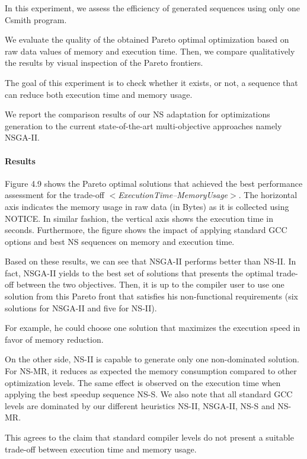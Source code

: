 In this experiment, we assess the efficiency of generated sequences using only one Csmith program.

We evaluate the quality of the obtained Pareto optimal optimization based on raw data values of memory and execution time. Then, we compare qualitatively the results by visual inspection of the Pareto frontiers.

The goal of this experiment is to check whether it exists, or not, a sequence that can reduce both execution time and memory usage.

We report the comparison results of our NS adaptation for optimizations generation to the current state-of-the-art multi-objective approaches namely NSGA-II. 

\paragraph{Results}

Figure 4.9 shows the Pareto optimal solutions that achieved the best performance assessment for the trade-off \textit{$<$ExecutionTime--MemoryUsage$>$}. 
The horizontal axis indicates the memory usage in raw data (in Bytes) as it is collected using NOTICE. In similar fashion, the vertical axis shows the execution time in seconds. Furthermore, the figure shows the impact of applying standard GCC options and best NS sequences on memory and execution time. 

Based on these results, we can see that NSGA-II performs better than NS-II. In fact, NSGA-II yields to the best set of solutions that presents the optimal trade-off between the two objectives. Then, it is up to the compiler user to use one solution from this Pareto front that satisfies his non-functional requirements (six solutions for NSGA-II and five for NS-II). 

For example, he could choose one solution that maximizes the execution speed in favor of memory reduction. 

On the other side, NS-II is capable to generate only one non-dominated solution. For NS-MR, it reduces as expected the memory consumption compared to other optimization levels. The same effect is observed on the execution time when applying the best speedup sequence NS-S. We also note that all standard GCC levels are dominated by our different heuristics NS-II, NSGA-II, NS-S and NS-MR.

This agrees to the claim that standard compiler levels do not present a suitable trade-off between execution time and memory usage.
	
